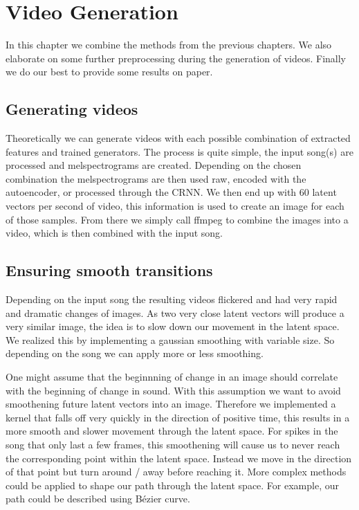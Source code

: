 \chapter{Video Generation}\label{ch:results}

    In this chapter we combine the methods from the previous chapters. We also elaborate on some further preprocessing during the generation of videos. Finally we do our best to provide some results on paper.

    \section{Generating videos}
        
        Theoretically we can generate videos with each possible combination of extracted features and trained generators. The process is quite simple, the input song(s) are processed and melspectrograms are created. Depending on the chosen combination the melspectrograms are then used raw, encoded with the autoencoder, or processed through the CRNN. We then end up with 60 latent vectors per second of video, this information is used to create an image for each of those samples. From there we simply call ffmpeg to combine the images into a video, which is then combined with the input song.

    \section{Ensuring smooth transitions}
        
        Depending on the input song the resulting videos flickered and had very rapid and dramatic changes of images. As two very close latent vectors will produce a very similar image, the idea is to slow down our movement in the latent space. We realized this by implementing a gaussian smoothing with variable size. So depending on the song we can apply more or less smoothing.
        
        One might assume that the beginnning of change in an image should correlate with the beginning of change in sound. With this assumption we want to avoid smoothening future latent vectors into an image. Therefore we implemented a kernel that falls off very quickly in the direction of positive time, this results in a more smooth and slower movement through the latent space. For spikes in the song that only last a few frames, this smoothening will cause us to never reach the corresponding point within the latent space. Instead we move in the direction of that point but turn around / away before reaching it. More complex methods could be applied to shape our path through the latent space. For example, our path could be described using Bézier curve.

